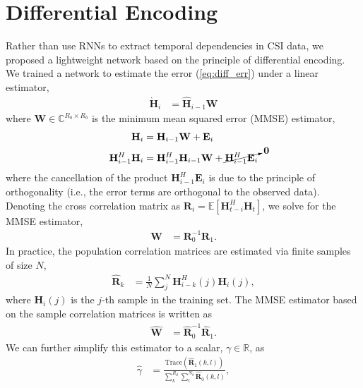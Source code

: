 \section{Differential Encoding} \label{sect:diff-enc}

Rather than use RNNs to extract temporal dependencies in CSI data, we proposed a lightweight network based on the principle of differential encoding. We trained a network to estimate the error (\ref{eq:diff_err}) under a linear estimator, 
\begin{align*}
	\grave{\mathbf H}_i &=  \hat{\mathbf H}_{i-1} \mathbf W
\end{align*}
where $\mathbf W \in \mathbb C^{R_b \times R_b}$ is the minimum mean squared error (MMSE) estimator,
\begin{align*}
	\mathbf H_i &= \mathbf H_{i-1}\mathbf W + \mathbf E_i \\
	\mathbf H_{i-1}^H\mathbf H_i &= \mathbf H_{i-1}^H\mathbf H_{i-1} \mathbf W + \cancelto{\mathbf 0}{\mathbf H_{i-1}^H\mathbf E_i}
\end{align*}
where the cancellation of the product $\mathbf H_{i-1}^H\mathbf E_i$ is due to the principle of orthogonality (i.e., the error terms are orthogonal to the observed data). Denoting the cross correlation matrix as $\mathbf R_{i} = \mathbb{E}\left[\mathbf H_{t-i}^H\mathbf H_{t}\right]$, we solve for the MMSE estimator,
\begin{align*}
	\mathbf W &= \mathbf R_0^{-1} \mathbf R_1.
\end{align*}
In practice, the population correlation matrices are estimated
via finite samples of size $N$,
\begin{align*}
	\mathbf{\hat R}_k &= \frac 1N \sum_{j}^N \mathbf H_{i-k}^H(j)\mathbf H_{i}(j),
\end{align*}
where $\mathbf H_i(j)$ is the $j$-th sample in the training set.
The MMSE estimator based on the sample correlation matrices is written as
\begin{align*}
	\hat{\mathbf W} &= \hat{\mathbf R}_0^{-1} \hat{\mathbf R}_1.
\end{align*}
We can further simplify this estimator to a scalar, $\gamma \in \mathbb R$, as
\begin{align*}
	\hat \gamma &= \frac{\text{Trace}(\hat{\mathbf R}_1(k,l))}{\sum_k^{R_d}\sum_l^{N_b}\hat{\mathbf R}_0(k,l)},
\end{align*}
